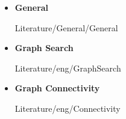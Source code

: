 \begin{frame}{\LectureFurtherLiterature}
  \begin{itemize}
    \item
      \textbf{General}
      \begin{btSect}{Literature/General/General}
        \btPrintAll
      \end{btSect}
  \end{itemize}
\end{frame}


\begin{frame}{\LectureFurtherLiterature}
  \begin{itemize}
    \item
      \textbf{Graph Search}
      \begin{btSect}{Literature/eng/GraphSearch}
        \btPrintAll
      \end{btSect}
    \item
      \textbf{Graph Connectivity}
      \begin{btSect}{Literature/eng/Connectivity}
        \btPrintAll
      \end{btSect}
  \end{itemize}
\end{frame}
